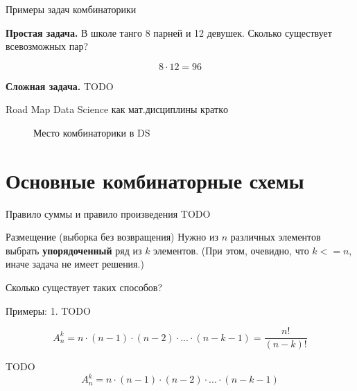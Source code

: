 \begin{frame}{Примеры задач комбинаторики}

\textbf{Простая задача.}
В школе танго 8 парней 
и 12 девушек.
Сколько существует всевозможных пар?

\begin{equation*}
8 \cdot 12 = 96
\end{equation*}

\textbf{Сложная задача.}
TODO

\end{frame}


\begin{frame}
	Road Map Data Science как мат.дисциплины \(кратко\)
	\begin{center}
		\begin{figure}
			
			\caption{Место комбинаторики в DS}
		\end{figure}	
	\end{center}
	
\end{frame}

\section{Основные комбинаторные схемы}\label{section:main_combinatorics_sxems}

\begin{frame}{Правило суммы и правило произведения}
TODO	
\end{frame}

\begin{frame}{Размещение (выборка без возвращения)}
Нужно из
$n$
различных элементов 
выбрать \textbf{упорядоченный}
ряд из $k$
элементов. 
(При этом, очевидно, что $k <=n$,
иначе задача не имеет решения.)

Сколько существует таких способов?   

Примеры:
1. TODO

\begin{equation}
A_n^k = n \cdot (n-1) \cdot (n-2) \cdot ... \cdot (n-k-1) = \frac{n!} {\left(n-k\right)!}
\end{equation}    


\end{frame}

\begin{frame}
TODO 
\begin{equation*}
A_n^k = n \cdot (n-1) \cdot (n-2) \cdot ... \cdot (n-k-1)
\end{equation*}  
\end{frame}


